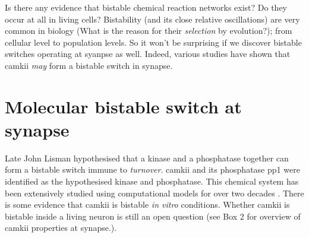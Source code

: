 \documentclass[]{resonance}
\begin{document}
Is there any evidence that bistable chemical reaction networks exist? Do they
occur at all in living cells?  Bistability (and its close relative oscillations)
are very common in biology (What is the reason for their \emph{selection}
by evolution?); from cellular level to population levels. So it
won't be surprising if we discover bistable switches operating at syanpse as
well. Indeed, various studies have shown that \gls{camkii} \emph{may} form a
bistable switch in synapse.

\section{Molecular bistable switch at synapse}\label{sec:molecular_switch}

Late John Lisman hypothesised that a kinase and a phosphatase together can form
a bistable switch immune to \emph{turnover}. \gls{camkii} and its phosphatase
\Gls{pp1} were identified as the hypothesised kinase and phosphatase. This
chemical system has been extensively studied using computational models for over
two decades \cite{sandstorm}. There is some evidence that \gls{camkii} is
bistable \emph{in vitro} conditions. Whether \gls{camkii} is bistable inside a
living neuron is still an open question (see Box 2 for overview of \gls{camkii}
properties at synapse.).
\end{document}
